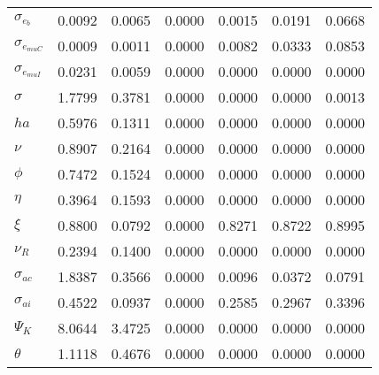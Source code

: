 \begin{center}
\begin{longtable}{lcccccc}
$ \sigma_{{e_b}}       $	 & 	          0.0092	 & 	          0.0065	 & 	          0.0000	 & 	          0.0015	 & 	          0.0191	 & 	          0.0668 \\ 
$ \sigma_{{e_{muC}}}   $	 & 	          0.0009	 & 	          0.0011	 & 	          0.0000	 & 	          0.0082	 & 	          0.0333	 & 	          0.0853 \\ 
$ \sigma_{{e_{muI}}}   $	 & 	          0.0231	 & 	          0.0059	 & 	          0.0000	 & 	          0.0000	 & 	          0.0000	 & 	          0.0000 \\ 
$ {\sigma}             $	 & 	          1.7799	 & 	          0.3781	 & 	          0.0000	 & 	          0.0000	 & 	          0.0000	 & 	          0.0013 \\ 
$ {ha}                 $	 & 	          0.5976	 & 	          0.1311	 & 	          0.0000	 & 	          0.0000	 & 	          0.0000	 & 	          0.0000 \\ 
$ \nu                  $	 & 	          0.8907	 & 	          0.2164	 & 	          0.0000	 & 	          0.0000	 & 	          0.0000	 & 	          0.0000 \\ 
$ {\phi}               $	 & 	          0.7472	 & 	          0.1524	 & 	          0.0000	 & 	          0.0000	 & 	          0.0000	 & 	          0.0000 \\ 
$ {\eta}               $	 & 	          0.3964	 & 	          0.1593	 & 	          0.0000	 & 	          0.0000	 & 	          0.0000	 & 	          0.0000 \\ 
$ \xi                  $	 & 	          0.8800	 & 	          0.0792	 & 	          0.0000	 & 	          0.8271	 & 	          0.8722	 & 	          0.8995 \\ 
$ {\nu_R}              $	 & 	          0.2394	 & 	          0.1400	 & 	          0.0000	 & 	          0.0000	 & 	          0.0000	 & 	          0.0000 \\ 
$ {\sigma_{ac}}        $	 & 	          1.8387	 & 	          0.3566	 & 	          0.0000	 & 	          0.0096	 & 	          0.0372	 & 	          0.0791 \\ 
$ {\sigma_{ai}}        $	 & 	          0.4522	 & 	          0.0937	 & 	          0.0000	 & 	          0.2585	 & 	          0.2967	 & 	          0.3396 \\ 
$ {\Psi_{K}}           $	 & 	          8.0644	 & 	          3.4725	 & 	          0.0000	 & 	          0.0000	 & 	          0.0000	 & 	          0.0000 \\ 
$ {\theta}             $	 & 	          1.1118	 & 	          0.4676	 & 	          0.0000	 & 	          0.0000	 & 	          0.0000	 & 	          0.0000 \\ 

\end{longtable}
\end{center}

